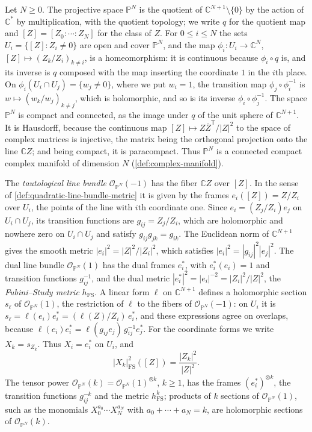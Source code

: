 \begin{example}\label{ex:projective-space-line-bundles}
Let $N\geq0$. The projective space $\mathbb P^N$ is the quotient of $\mathbb C^{N+1}\setminus\{0\}$ by the action of $\mathbb C^*$ by multiplication, with the quotient topology; we write $q$ for the quotient map and $[Z]=[Z_0:\cdots:Z_N]$ for the class of $Z$. For $0\leq i\leq N$ the sets $U_i=\{[Z]:Z_i\neq0\}$ are open and cover $\mathbb P^N$, and the map $\phi_i\colon U_i\to\mathbb C^N$, $[Z]\mapsto(Z_k/Z_i)_{k\neq i}$, is a homeomorphism: it is continuous because $\phi_i\circ q$ is, and its inverse is $q$ composed with the map inserting the coordinate $1$ in the $i$th place. On $\phi_i(U_i\cap U_j)=\{w_j\neq0\}$, where we put $w_i=1$, the transition map $\phi_j\circ\phi_i^{-1}$ is $w\mapsto(w_k/w_j)_{k\neq j}$, which is holomorphic, and so is its inverse $\phi_i\circ\phi_j^{-1}$. The space $\mathbb P^N$ is compact and connected, as the image under $q$ of the unit sphere of $\mathbb C^{N+1}$. It is Hausdorff, because the continuous map $[Z]\mapsto Z\overline Z^{\mathsf T}/|Z|^2$ to the space of complex matrices is injective, the matrix being the orthogonal projection onto the line $\mathbb CZ$; and being compact, it is paracompact. Thus $\mathbb P^N$ is a connected compact complex manifold of dimension $N$ (\cref{def:complex-manifold}).

The \emph{tautological line bundle} $\mathcal O_{\mathbb P^N}(-1)$ has the fiber $\mathbb CZ$ over $[Z]$. In the sense of \cref{def:quadratic-line-bundle-metric} it is given by the frames $e_i([Z])=Z/Z_i$ over $U_i$, the points of the line with $i$th coordinate one. Since $e_i=(Z_j/Z_i)e_j$ on $U_i\cap U_j$, its transition functions are $g_{ij}=Z_j/Z_i$, which are holomorphic and nowhere zero on $U_i\cap U_j$ and satisfy $g_{ij}g_{jk}=g_{ik}$. The Euclidean norm of $\mathbb C^{N+1}$ gives the smooth metric $|e_i|^2=|Z|^2/|Z_i|^2$, which satisfies $|e_i|^2=|g_{ij}|^2|e_j|^2$. The dual line bundle $\mathcal O_{\mathbb P^N}(1)$ has the dual frames $e_i^*$, with $e_i^*(e_i)=1$ and transition functions $g_{ij}^{-1}$, and the dual metric $|e_i^*|^2=|e_i|^{-2}=|Z_i|^2/|Z|^2$, the \emph{Fubini--Study metric} $h_{\mathrm{FS}}$. A linear form $\ell$ on $\mathbb C^{N+1}$ defines a holomorphic section $s_\ell$ of $\mathcal O_{\mathbb P^N}(1)$, the restriction of $\ell$ to the fibers of $\mathcal O_{\mathbb P^N}(-1)$: on $U_i$ it is $s_\ell=\ell(e_i)e_i^*=(\ell(Z)/Z_i)\,e_i^*$, and these expressions agree on overlaps, because $\ell(e_i)e_i^*=\ell(g_{ij}e_j)\,g_{ij}^{-1}e_j^*$. For the coordinate forms we write $X_k=s_{Z_k}$. Thus $X_i=e_i^*$ on $U_i$, and
\[
 |X_k|_{\mathrm{FS}}^2([Z])=\frac{|Z_k|^2}{|Z|^2}.
\]
The tensor power $\mathcal O_{\mathbb P^N}(k)=\mathcal O_{\mathbb P^N}(1)^{\otimes k}$, $k\geq1$, has the frames $(e_i^*)^{\otimes k}$, the transition functions $g_{ij}^{-k}$ and the metric $h_{\mathrm{FS}}^k$; products of $k$ sections of $\mathcal O_{\mathbb P^N}(1)$, such as the monomials $X_0^{a_0}\cdots X_N^{a_N}$ with $a_0+\cdots+a_N=k$, are holomorphic sections of $\mathcal O_{\mathbb P^N}(k)$.
\end{example}

